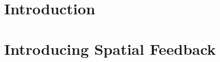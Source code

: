 \documentclass[journal]{IEEEtran}
\begin{document}
%
\IEEEpeerreviewmaketitle
% 
% 
% 
% 
\section{Introduction}

\section{Introducing Spatial Feedback}
\label{sec_introduceFeedback}

\end{document}
